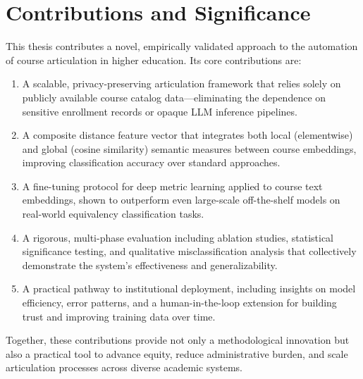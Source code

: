 \section{Contributions and Significance}
This thesis contributes a novel, empirically validated approach to the automation of course articulation in higher education. Its core contributions are:
\begin{enumerate}
    \item A scalable, privacy-preserving articulation framework that relies solely on publicly available course catalog data—eliminating the dependence on sensitive enrollment records or opaque LLM inference pipelines.
    \item A composite distance feature vector that integrates both local (elementwise) and global (cosine similarity) semantic measures between course embeddings, improving classification accuracy over standard approaches.
    \item A fine-tuning protocol for deep metric learning applied to course text embeddings, shown to outperform even large-scale off-the-shelf models on real-world equivalency classification tasks.
    \item A rigorous, multi-phase evaluation including ablation studies, statistical significance testing, and qualitative misclassification analysis that collectively demonstrate the system's effectiveness and generalizability.
    \item A practical pathway to institutional deployment, including insights on model efficiency, error patterns, and a human-in-the-loop extension for building trust and improving training data over time.
\end{enumerate}
Together, these contributions provide not only a methodological innovation but also a practical tool to advance equity, reduce administrative burden, and scale articulation processes across diverse academic systems.